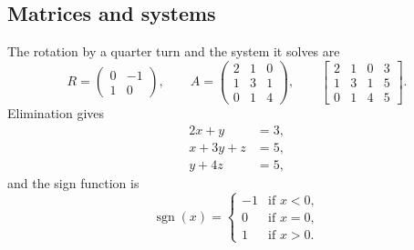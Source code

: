 \documentclass[11pt]{article}
\begin{document}
\subsection{Matrices and systems}

The rotation by a quarter turn and the system it solves are
\[
R = \begin{pmatrix} 0 & -1 \\ 1 & 0 \end{pmatrix}, \qquad
A = \begin{pmatrix} 2 & 1 & 0 \\ 1 & 3 & 1 \\ 0 & 1 & 4 \end{pmatrix}, \qquad
\left[\begin{array}{ccc|c} 2 & 1 & 0 & 3 \\ 1 & 3 & 1 & 5 \\ 0 & 1 & 4 & 5 \end{array}\right].
\]
Elimination gives
\begin{align*}
2x + y &= 3, \\
x + 3y + z &= 5, \\
y + 4z &= 5,
\end{align*}
and the sign function is
\[
\operatorname{sgn}(x) = \begin{cases} -1 & \text{if } x < 0, \\ 0 & \text{if } x = 0, \\ 1 & \text{if } x > 0. \end{cases}
\]
\end{document}

